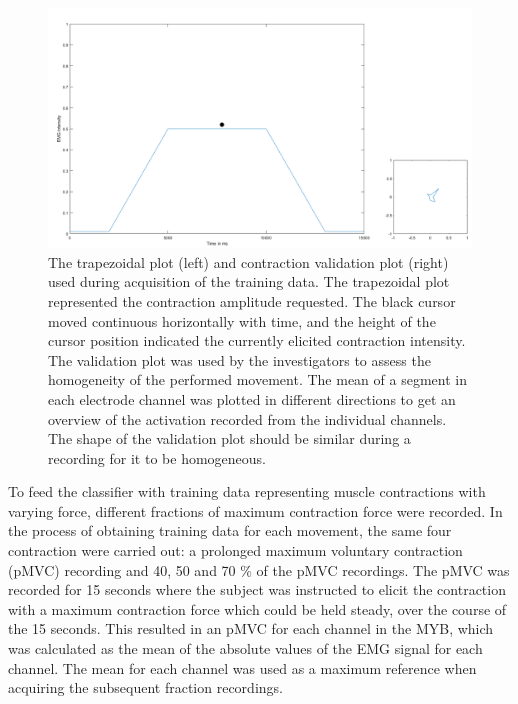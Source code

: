 \begin{figure}[H]                 
	\includegraphics[width=1\textwidth]{figures/trapezoid}  
	\caption{The trapezoidal plot (left) and contraction validation plot (right) used during acquisition of the training data. The trapezoidal plot represented the contraction amplitude requested. The black cursor moved continuous horizontally with time, and the height of the cursor position indicated the currently elicited contraction intensity. The validation plot was used by the investigators to assess the homogeneity of the performed movement. The mean of a segment in each electrode channel was plotted in different directions to get an overview of the activation recorded from the individual channels. The shape of the validation plot should be similar during a recording for it to be homogeneous.}
	\label{fig:GUI} 
\end{figure}
\vspace{-1em}

To feed the classifier with training data representing muscle contractions with varying force, different fractions of maximum contraction force were recorded. In the process of obtaining training data for each movement, the same four contraction were carried out: a prolonged maximum voluntary contraction (pMVC) recording and 40, 50 and 70 $\percent$ of the pMVC recordings.
The pMVC was recorded for 15 seconds where the subject was instructed to elicit the contraction with a maximum contraction force which could be held steady, over the course of the 15 seconds. This resulted in an pMVC for each channel in the MYB, which was calculated as the mean of the absolute values of the EMG signal for each channel. The mean for each channel was used as a maximum reference when acquiring the subsequent fraction recordings. 

